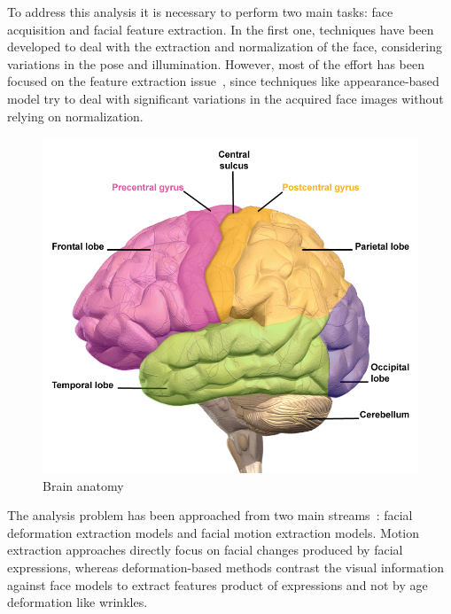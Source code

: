 To address this analysis it is necessary to perform two main tasks: face acquisition and facial feature extraction. In the first one, techniques have been developed to deal with the extraction and normalization of the face, considering variations in the pose %
and illumination. %
However, most of the effort has been focused on the feature extraction issue~\cite{Fasel2003}, since techniques like appearance-based model %
try to deal with significant variations in the acquired face images without relying on normalization.

\begin{figure}[ht]
    \centering
    \includegraphics[scale=1.0]{images/Figure6Brain.png}
    \caption{Brain anatomy}
    \label{fig:Brain anatomy}
\end{figure}

The analysis problem has been approached from two main streams~\cite{Fasel2003}: facial deformation extraction models and facial motion extraction models. Motion extraction approaches directly focus on facial changes produced by facial expressions, whereas deformation-based methods contrast the visual information against face models to extract features product of expressions and not by age deformation like wrinkles.

